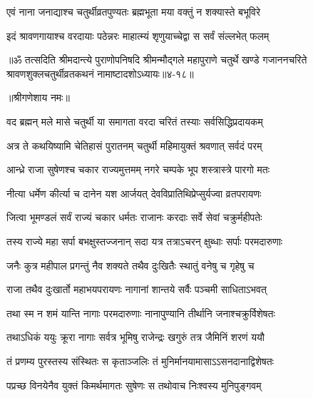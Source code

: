 \twolineshloka
{एवं नाना जनाद्याश्च चतुर्थीव्रतपुण्यतः}
{ब्रह्मभूता मया वक्तुं न शक्यास्ते बभूविरे} %

\twolineshloka
{इदं श्रावणगायाश्च वरदायाः पठेन्नरः}
{माहात्म्यं श‍ृणुयाच्चेद्वा स सर्वं संल्लभेत् फलम्} %

॥ॐ तत्सदिति श्रीमदान्त्ये पुराणोपनिषदि श्रीमन्मौद्गले महापुराणे चतुर्थे खण्डे गजाननचरिते श्रावणशुक्लचतुर्थीव्रतकथनं नामाष्टादशोऽध्यायः॥४-१८॥


\label{sec:malamasa-shukla-chaturthi-mahatmya-varnanam}

\centerline{॥श्रीगणेशाय नमः॥}


\twolineshloka
{वद ब्रह्मन् मले मासे चतुर्थी या समागता}
{वरदा चरितं तस्याः सर्वसिद्धिप्रदायकम्} %


\twolineshloka
{अत्र ते कथयिष्यामि चेतिहासं पुरातनम्}
{चतुर्थी महिमायुक्तं श्रवणात् सर्वदं परम्} %

\twolineshloka
{आन्ध्रे राजा सुषेणश्च चकार राज्यमुत्तमम्}
{नगरे चम्पके भूप शस्त्रास्त्रे पारगो मतः} %

\twolineshloka
{नीत्या धर्मेण कीर्त्या च दानेन यश आर्जयत्}
{देवविप्रातिथिप्रेप्सुर्यज्वा व्रतपरायणः} %

\twolineshloka
{जित्वा भूमण्डलं सर्वं राज्यं चकार धर्मतः}
{राजानः करदाः सर्वे सेवां चक्रुर्महीपतेः} %

\twolineshloka
{तस्य राज्ये महा सर्पा बभक्षुस्तज्जनान् सदा}
{यत्र तत्राऽचरन् क्षुब्धाः सर्पाः परमदारुणाः} %

\twolineshloka
{जनैः कुत्र महीपाल प्रगन्तुं नैव शक्यते}
{तथैव दुःखितैः स्थातुं वनेषु च गृहेषु च} %

\twolineshloka
{राजा तथैव दुःखार्तो महाभयपरायणः}
{नागानां शान्तये सर्वैः पञ्चमी साधिताऽभवत्} %

\twolineshloka
{तथा स्म न शमं यान्ति नागाः परमदारुणाः}
{नानापुण्यानि तीर्थानि जनाश्चक्रुर्विशेषतः} %

\twolineshloka
{तथाऽधिकं ययुः क्रूरा नागाः सर्वत्र भूमिषु}
{राजेन्द्रः खगुरुं तत्र जैमिनिं शरणं ययौ} %

\twolineshloka
{तं प्रणम्य पुरस्तस्य संस्थितः स कृताञ्जलिः}
{तं मुनिर्मानयामासाऽऽसनदानाद्विशेषतः} %

\twolineshloka
{पप्रच्छ विनयेनैव युक्तं किमर्थमागतः}
{सुषेणः स तथोवाच निःश्वस्य मुनिपुङ्गवम्} %


